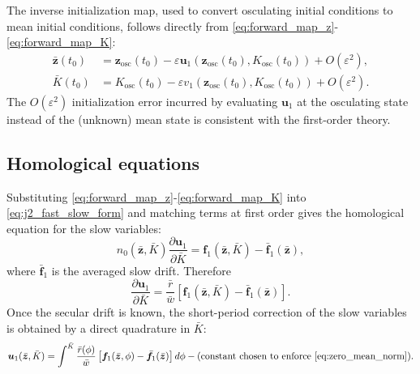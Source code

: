 \documentclass[11pt]{article}
\begin{document}
The inverse initialization map, used to convert osculating initial conditions
to mean initial conditions, follows directly from
\eqref{eq:forward_map_z}-\eqref{eq:forward_map_K}:
\begin{align}
\bar{\bm z}(t_0)
&= \bm z_{\mathrm{osc}}(t_0)
- \varepsilon \bm u_1\!\left(\bm z_{\mathrm{osc}}(t_0),K_{\mathrm{osc}}(t_0)\right)
+ O(\varepsilon^2), \label{eq:inverse_map_z}\\
\bar K(t_0)
&= K_{\mathrm{osc}}(t_0)
- \varepsilon v_1\!\left(\bm z_{\mathrm{osc}}(t_0),K_{\mathrm{osc}}(t_0)\right)
+ O(\varepsilon^2).
\label{eq:inverse_map_K}
\end{align}
The $O(\varepsilon^2)$ initialization error incurred by evaluating $\bm u_1$
at the osculating state instead of the (unknown) mean state is consistent
with the first-order theory.

\subsection{Homological equations}

Substituting \eqref{eq:forward_map_z}-\eqref{eq:forward_map_K} into
\eqref{eq:j2_fast_slow_form} and matching terms at first order gives the
homological equation for the slow variables:
\begin{equation}
n_0(\bar{\bm z},\bar K)
\frac{\partial \bm u_1}{\partial \bar K}
= \bm f_1(\bar{\bm z},\bar K)
- \bar{\bm f}_1(\bar{\bm z}),
\label{eq:homological_u}
\end{equation}
where $\bar{\bm f}_1$ is the averaged slow drift. Therefore
\begin{equation}
\frac{\partial \bm u_1}{\partial \bar K}
= \frac{\bar r}{\bar w}
\left[
\bm f_1(\bar{\bm z},\bar K)
- \bar{\bm f}_1(\bar{\bm z})
\right].
\label{eq:u_prime}
\end{equation}
Once the secular drift is known, the short-period correction of the slow
variables is obtained by a direct quadrature in $\bar K$:
\begin{equation}
\bm u_1(\bar{\bm z},\bar K)
= \int^{\bar K}
\frac{\bar r(\phi)}{\bar w}
\left[
\bm f_1(\bar{\bm z},\phi)
- \bar{\bm f}_1(\bar{\bm z})
\right] d\phi
- \text{(constant chosen to enforce \eqref{eq:zero_mean_norm})}.
\label{eq:u_integral}
\end{equation}
\end{document}
